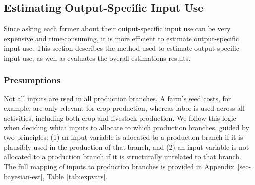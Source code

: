 \documentclass[12pt]{article}
\begin{document}
\subsection{Estimating Output-Specific Input Use}
\label{sec:serie-b}
Since asking each farmer about their output-specific input use can be very expensive and time-consuming, it is more efficient to estimate output-specific input use. 
This section describes the method used to estimate output-specific input use, as well as evaluates the overall estimations results.

\subsubsection{Presumptions}
Not all inputs are used in all production branches. 
A farm's seed costs, for example, are only relevant for crop production, whereas labor is used across all activities, including both crop and livestock production.
We follow this logic when deciding which inputs to allocate to which production branches, guided by two principles: (1) an input variable is allocated to a production branch if it is plausibly used in the production of that branch, and (2) an input variable is not allocated to a production branch if it is structurally unrelated to that branch. 
The full mapping of inputs to production branches is provided in Appendix~\ref{sec-bayesian-est}, Table~\ref{tab:expvars}.
\end{document}
